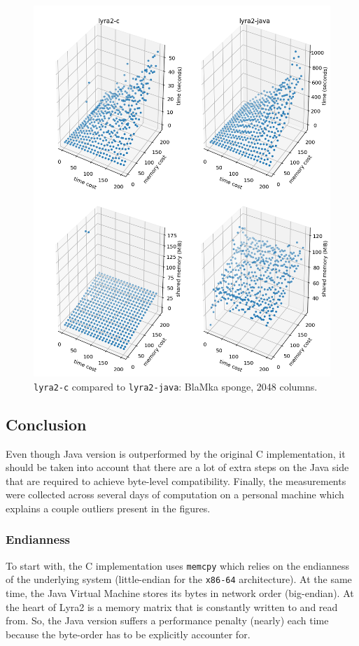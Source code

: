 \begin{figure}[H]
    \centering
    \includegraphics[width=\linewidth]{figures/tcost_mcost_blamka_2048}
    \caption{\texttt{lyra2-c} compared to \texttt{lyra2-java}: BlaMka sponge, 2048 columns.}
    \label{figure:tcost_mcost_blamka_2048}
\end{figure}

\subsection{Conclusion}

Even though Java version is outperformed by the original C implementation, it should be taken into account that there are a lot of extra steps on the Java side that are required to achieve byte-level compatibility. Finally, the measurements were collected across several days of computation on a personal machine which explains a couple outliers present in the figures.

\subsubsection{Endianness}
To start with, the C implementation uses \texttt{memcpy} which relies on the endianness of the underlying system (little-endian for the \texttt{x86-64} architecture). At the same time, the Java Virtual Machine stores its bytes in network order (big-endian). At the heart of Lyra2 is a memory matrix that is constantly written to and read from. So, the Java version suffers a performance penalty (nearly) each time because the byte-order has to be explicitly accounter for.

